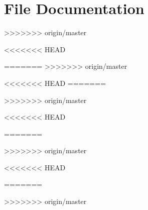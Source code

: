 \documentclass[twoside]{book}
\newcommand{\+}{\discretionary{\mbox{\scriptsize$\hookleftarrow$}}{}{}}
\newcommand{\clearemptydoublepage}{%
    \newpage{\pagestyle{empty}\cleardoublepage}%
  }
\begin{document}
\chapter{File Documentation}







>>>>>>> origin/master




<<<<<<< HEAD


=======
>>>>>>> origin/master
















<<<<<<< HEAD
=======




>>>>>>> origin/master




<<<<<<< HEAD







=======




>>>>>>> origin/master










<<<<<<< HEAD





=======







>>>>>>> origin/master
  \backmatter
  \newpage
  \clearemptydoublepage
  \printindex
\end{document}

